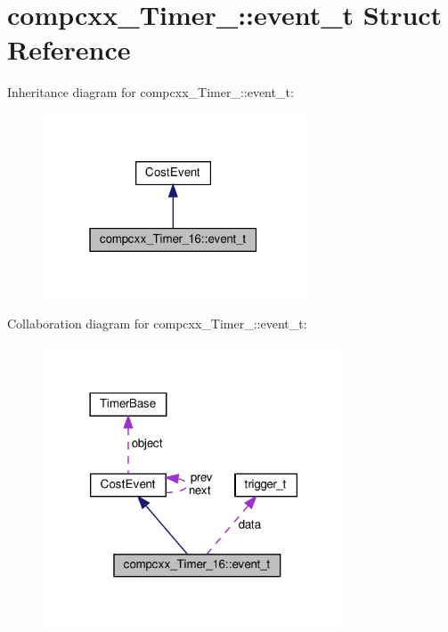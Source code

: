 \hypertarget{structcompcxx__Timer__16_1_1event__t}{}\section{compcxx\+\_\+\+Timer\+\_\+:\+:event\+\_\+t Struct Reference}
\label{structcompcxx__Timer__16_1_1event__t}


Inheritance diagram for compcxx\+\_\+\+Timer\+\_\+:\+:event\+\_\+t\+:\nopagebreak
\begin{figure}[H]
\begin{center}
\leavevmode
\includegraphics[width=220pt]{structcompcxx__Timer__16_1_1event__t__inherit__graph}
\end{center}
\end{figure}


Collaboration diagram for compcxx\+\_\+\+Timer\+\_\+:\+:event\+\_\+t\+:\nopagebreak
\begin{figure}[H]
\begin{center}
\leavevmode
\includegraphics[width=254pt]{structcompcxx__Timer__16_1_1event__t__coll__graph}
\end{center}
\end{figure}
